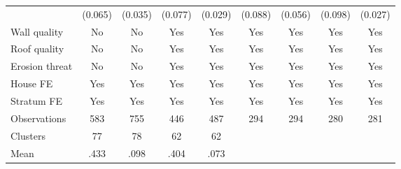 {\begin{tabular}{l*{8}{c}}
                &  (0.065)         &  (0.035)         &  (0.077)         &  (0.029)         &  (0.088)         &  (0.056)         &  (0.098)         &  (0.027)         \\
Wall quality    &       No         &       No         &      Yes         &      Yes         &      Yes         &      Yes         &      Yes         &      Yes         \\
Roof quality    &       No         &       No         &      Yes         &      Yes         &      Yes         &      Yes         &      Yes         &      Yes         \\
Erosion threat  &       No         &       No         &      Yes         &      Yes         &      Yes         &      Yes         &      Yes         &      Yes         \\
House FE        &      Yes         &      Yes         &      Yes         &      Yes         &      Yes         &      Yes         &      Yes         &      Yes         \\
Stratum FE      &      Yes         &      Yes         &      Yes         &      Yes         &      Yes         &      Yes         &      Yes         &      Yes         \\
\hline
Observations    &      583         &      755         &      446         &      487         &      294         &      294         &      280         &      281         \\
Clusters        &       77         &       78         &       62         &       62         &                  &                  &                  &                  \\
Mean            &     .433         &     .098         &     .404         &     .073         &                  &                  &                  &                  \\
\hline\hline
\end{tabular}
}
